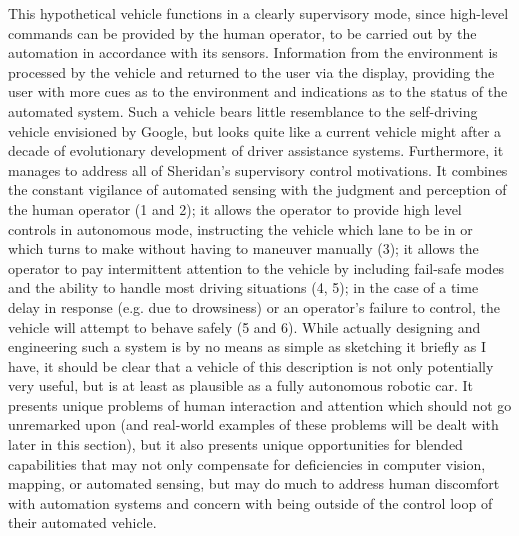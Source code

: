 This hypothetical vehicle functions in a clearly supervisory mode,
since high-level commands can be provided by the human operator, to be
carried out by the automation in accordance with its sensors.
Information from the environment is processed by the vehicle and
returned to the user via the display, providing the user with more
cues as to the environment and indications as to the status of the
automated system. Such a vehicle bears little resemblance to the
self-driving vehicle envisioned by Google, but looks quite like a
current vehicle might after a decade of evolutionary development of
driver assistance systems. Furthermore, it manages to address all of
Sheridan's supervisory control motivations. It combines the constant
vigilance of automated sensing with the judgment and perception of the
human operator (1 and 2); it allows the operator to provide high level
controls in autonomous mode, instructing the vehicle which lane to be
in or which turns to make without having to maneuver manually (3); it
allows the operator to pay intermittent attention to the vehicle by
including fail-safe modes and the ability to handle most driving
situations (4, 5); in the case of a time delay in response (e.g. due
to drowsiness) or an
operator's failure to control, the vehicle will attempt to behave
safely (5 and 6). While actually designing and engineering such a
system is by no means as simple as sketching it briefly as I have, it
should be clear that a vehicle of this description is not only
potentially very useful, but is at least as plausible as a fully
autonomous robotic car. It presents unique problems of human
interaction and attention which should not go unremarked upon (and
real-world examples of these problems will be dealt with later in this
section), but it also presents unique opportunities for blended
capabilities that may not only compensate for deficiencies in computer
vision, mapping, or automated sensing, but may do much to address
human discomfort with automation systems and concern with being
outside of the control loop of their automated vehicle.

